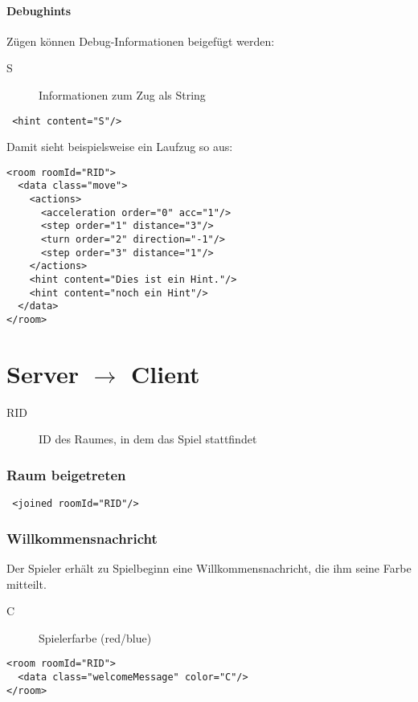 \documentclass[12pt,a4paper, ngerman, oneside]{scrartcl}
\begin{document}
\subsection{Debughints}
Zügen können Debug-Informationen beigefügt werden:
\begin{description}
\item[S] Informationen zum Zug als String
\end{description}
\begin{verbatim}
 <hint content="S"/>
\end{verbatim}
Damit sieht beispielsweise ein Laufzug so aus:
\begin{verbatim}
<room roomId="RID">
  <data class="move">
    <actions>
      <acceleration order="0" acc="1"/>
      <step order="1" distance="3"/>
      <turn order="2" direction="-1"/>
      <step order="3" distance="1"/>
    </actions>
    <hint content="Dies ist ein Hint."/>
    <hint content="noch ein Hint"/>
  </data>
</room>
\end{verbatim}



\newpage
\part{Server $\rightarrow$ Client}
\begin{description}
\item[RID] ID des Raumes, in dem das Spiel stattfindet
\end{description}

\section{Raum beigetreten}
 \begin{verbatim}
 <joined roomId="RID"/>
 \end{verbatim}

\section{Willkommensnachricht}
Der Spieler erhält zu Spielbeginn eine Willkommensnachricht, die ihm seine Farbe mitteilt.
\begin{description}
\item[C] Spielerfarbe (red/blue)
\end{description}
\begin{verbatim}
<room roomId="RID">
  <data class="welcomeMessage" color="C"/>
</room>
\end{verbatim}
\end{document}
